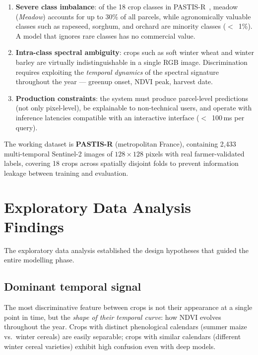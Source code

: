 \documentclass{article}
\begin{document}
\begin{enumerate}[leftmargin=*]
    \item \textbf{Severe class imbalance}: of the 18 crop classes in
    PASTIS-R~\cite{garnot2021pastis}, meadow (\textit{Meadow}) accounts
    for up to 30\% of all parcels, while agronomically valuable classes
    such as rapeseed, sorghum, and orchard are minority classes
    ($<$~1\%). A model that ignores rare classes has no commercial value.

    \item \textbf{Intra-class spectral ambiguity}: crops such as soft winter
    wheat and winter barley are virtually indistinguishable in a single
    RGB image. Discrimination requires exploiting the \textit{temporal
    dynamics} of the spectral signature throughout the year --- greenup
    onset, NDVI peak, harvest date.

    \item \textbf{Production constraints}: the system must produce
    parcel-level predictions (not only pixel-level), be explainable to
    non-technical users, and operate with inference latencies compatible
    with an interactive interface ($<$~100\,ms per query).
\end{enumerate}

The working dataset is \textbf{PASTIS-R} (metropolitan France), containing
2,433 multi-temporal Sentinel-2 images of $128\times128$ pixels with
real farmer-validated labels, covering 18 crops across spatially disjoint
folds to prevent information leakage between training and evaluation.

\section{Exploratory Data Analysis Findings}

The exploratory data analysis established the design
hypotheses that guided the entire modelling phase.

\subsection{Dominant temporal signal}
The most discriminative feature between crops is not their appearance at a
single point in time, but the \textit{shape of their temporal curve}: how
NDVI evolves throughout the year. Crops with distinct phenological
calendars (summer maize vs.\ winter cereals) are easily separable; crops
with similar calendars (different winter cereal varieties) exhibit high
confusion even with deep models.
\end{document}
